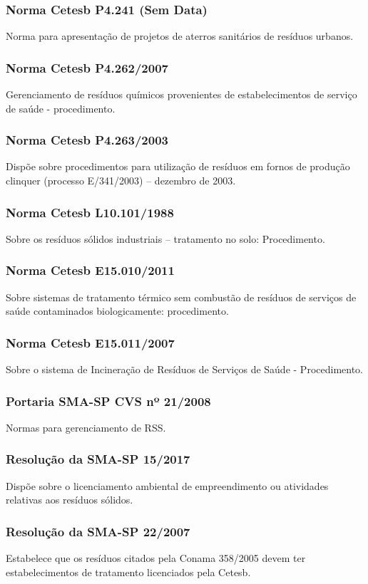 \begin{subapend}
\begin{subsubapend}
		\subsubsection{Norma Cetesb P4.241 (Sem Data)}
		Norma para apresentação de projetos de aterros sanitários de resíduos urbanos.
		\subsubsection{Norma Cetesb P4.262/2007}
		Gerenciamento de resíduos químicos provenientes de estabelecimentos de serviço de saúde - procedimento.
		\subsubsection{Norma Cetesb P4.263/2003}
		Dispõe sobre procedimentos para utilização de resíduos em fornos de produção clinquer (processo E/341/2003) – dezembro de 2003.
		\subsubsection{Norma Cetesb L10.101/1988} 
		Sobre os resíduos sólidos industriais – tratamento no solo: Procedimento.
		\subsubsection{Norma Cetesb E15.010/2011}
		Sobre sistemas de tratamento térmico sem combustão de resíduos de serviços de saúde contaminados biologicamente: procedimento.
		\subsubsection{Norma Cetesb E15.011/2007}
		Sobre o sistema de Incineração de Resíduos de Serviços de Saúde - Procedimento.
		\subsubsection{Portaria SMA-SP  CVS nº 21/2008}
		Normas para gerenciamento de RSS.
		\subsubsection{Resolução da SMA-SP 15/2017}
		Dispõe sobre o licenciamento ambiental de empreendimento ou atividades relativas aos resíduos sólidos.
		\subsubsection{Resolução da SMA-SP 22/2007}
		Estabelece que os resíduos citados pela Conama 358/2005 devem ter estabelecimentos de tratamento licenciados pela Cetesb.

\end{subsubapend}
\end{subapend}
